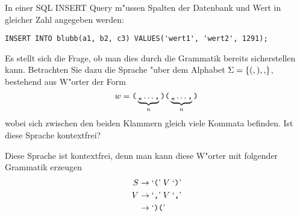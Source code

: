 In einer SQL INSERT Query m"ussen Spalten der Datenbank und Wert
in gleicher Zahl angegeben werden:
\begin{verbatim}
INSERT INTO blubb(a1, b2, c3) VALUES('wert1', 'wert2', 1291);
\end{verbatim}
Es stellt sich die Frage, ob man dies durch die Grammatik bereits
sicherstellen kann.
Betrachten Sie dazu die Sprache "uber dem Alphabet 
$\Sigma= \{ {\tt (}, {\tt )}, {\tt ,}\}$, bestehend aus W"orter der
Form
\[
w=
\text{\tt (}\underbrace{\text{\tt ,,}\dots\text{\tt ,}}_{n}
\text{\tt)(}\underbrace{\text{\tt,,}\dots\text{\tt ,}}_{n}\text{\tt )}
\]
wobei sich zwischen den beiden Klammern gleich viele Kommata befinden.
Ist diese Sprache kontextfrei?

\begin{loesung}
Diese Sprache ist kontextfrei, denn man kann diese W"orter mit folgender
Grammatik erzeugen
\begin{align*}
S&\rightarrow \text{`{\tt (}'}\; V \; \text{`{\tt )}'}\\
V&\rightarrow \text{`{\tt ,}'}\; V \; \text{`{\tt ,}'}\\
 &\rightarrow \text{`{\tt )(}'}
\end{align*}
\end{loesung}

